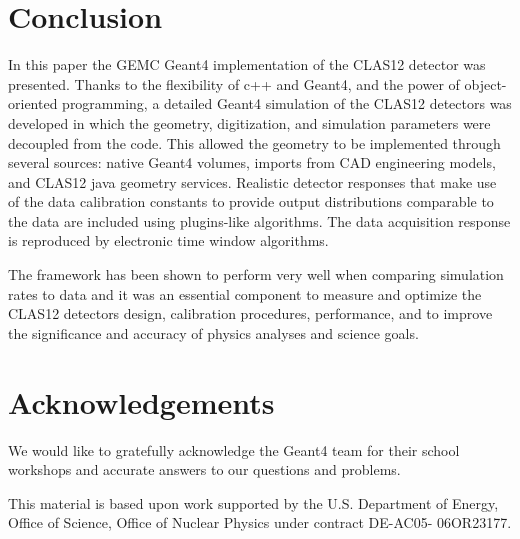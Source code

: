 \section{Conclusion}
In this paper the GEMC Geant4 implementation of the CLAS12 detector was presented.
Thanks to the flexibility of c++ and Geant4, and the power of object-oriented programming,
a detailed Geant4 simulation of the CLAS12 detectors was developed in which the geometry,
digitization, and simulation parameters were decoupled from the code.
This allowed the geometry to be implemented through several sources: native Geant4 volumes, imports from CAD engineering models,
and CLAS12 java geometry services. Realistic detector responses that
make use of the data calibration constants to provide output distributions comparable to the data are included
using plugins-like algorithms. The data acquisition response is reproduced by electronic time window algorithms.

The framework has been shown to perform very well when comparing simulation rates to data
and it was an essential component to measure and optimize the CLAS12 detectors design, calibration procedures, performance,
and to improve the significance and accuracy of physics analyses and science goals.

\section{Acknowledgements}

We would like to gratefully acknowledge the Geant4 team
for their school workshops and accurate answers to our questions and problems.

This material is based upon work supported by the U.S. Department of Energy,
Office of Science, Office of Nuclear Physics under contract DE-AC05- 06OR23177.

